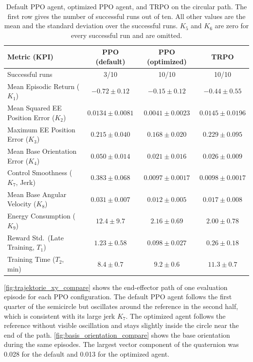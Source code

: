 \documentclass{ieeeaccess}
\begin{document}
\begin{table}[t]
	\centering
	\caption{Default PPO agent, optimized PPO agent, and TRPO on the circular path. The first row gives the
		number of successful runs out of ten. All other values are the mean and the standard deviation over
		the successful runs. $K_5$ and $K_6$ are zero for every successful run and are omitted.}
    \label{tab:ppo_optimization_kpi}
	\renewcommand{\arraystretch}{1.2}
	\setlength{\tabcolsep}{8pt}
	\begin{tabular}{lccc}
		\toprule
		\textbf{Metric (KPI)} & \textbf{PPO (default)} & \textbf{PPO (optimized)} & \textbf{TRPO} \\
		\midrule
		Successful runs & 3/10 & 10/10 & 10/10 \\
		Mean Episodic Return ($K_1$) & $-0.72 \pm 0.12$ & $-0.15 \pm 0.12$ & $-0.44 \pm 0.55$ \\
		Mean Squared EE Position Error ($K_2$) & $0.0134 \pm 0.0081$ & $0.0041 \pm 0.0023$ & $0.0145 \pm 0.0196$ \\
		Maximum EE Position Error ($K_3$) & $0.215 \pm 0.040$ & $0.168 \pm 0.020$ & $0.229 \pm 0.095$ \\
		Mean Base Orientation Error ($K_4$) & $0.050 \pm 0.014$ & $0.021 \pm 0.016$ & $0.026 \pm 0.009$ \\
		Control Smoothness ($K_7$, Jerk) & $0.383 \pm 0.068$ & $0.0097 \pm 0.0017$ & $0.0098 \pm 0.0017$ \\
		Mean Base Angular Velocity ($K_8$) & $0.031 \pm 0.007$ & $0.012 \pm 0.005$ & $0.017 \pm 0.008$ \\
		Energy Consumption ($K_9$) & $12.4 \pm 9.7$ & $2.16 \pm 0.69$ & $2.00 \pm 0.78$ \\
		Reward Std.\ (Late Training, $T_1$) & $1.23 \pm 0.58$ & $0.098 \pm 0.027$ & $0.26 \pm 0.18$ \\
		Training Time ($T_2$, min) & $8.4 \pm 0.7$ & $9.2 \pm 0.6$ & $11.3 \pm 0.7$ \\
		\bottomrule
	\end{tabular}
\end{table}

\cref{fig:trajektorie_xy_compare} shows the end-effector path of one evaluation episode for each PPO
configuration. The default PPO agent follows the first quarter of the semicircle but oscillates around
the reference in the second half, which is consistent with its large jerk $K_7$. The optimized agent
follows the reference without visible oscillation and stays slightly inside the circle near the end of
the path. \cref{fig:basis_orientation_compare} shows the base orientation during the same episodes. The
largest vector component of the quaternion was 0.028 for the default and 0.013 for the optimized agent.
\end{document}
